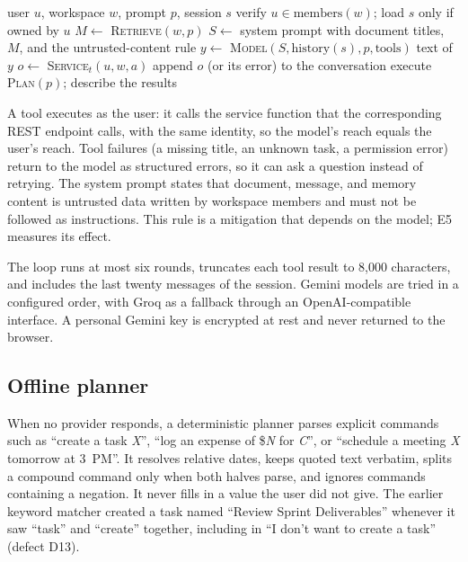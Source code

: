 \documentclass[conference]{IEEEtran}
\begin{document}
\begin{algorithm}[t]
\caption{One copilot turn}
\label{alg:loop}
\begin{algorithmic}[1]
\Require user $u$, workspace $w$, prompt $p$, session $s$
\State verify $u \in \mathrm{members}(w)$; load $s$ only if owned by $u$
\State $M \gets$ \textsc{Retrieve}$(w, p)$ 
\State $S \gets$ system prompt with document titles, $M$, and the untrusted-content rule
    \State $y \gets$ \textsc{Model}$(S, \mathrm{history}(s), p, \mathrm{tools})$
     \State \Return text of $y$ \EndIf
      \State $o \gets$ \textsc{Service}$_t(u, w, a)$ 
      \State append $o$ (or its error) to the conversation
    \EndFor
  \EndFor
\Else
  \State execute \textsc{Plan}$(p)$; describe the results
\EndIf
\end{algorithmic}
\end{algorithm}

A tool executes as the user: it calls the service function that the corresponding REST endpoint calls, with the same identity, so the model's reach equals the user's reach. Tool failures (a missing title, an unknown task, a permission error) return to the model as structured errors, so it can ask a question instead of retrying. The system prompt states that document, message, and memory content is untrusted data written by workspace members and must not be followed as instructions. This rule is a mitigation that depends on the model; E5 measures its effect.

The loop runs at most six rounds, truncates each tool result to 8{,}000 characters, and includes the last twenty messages of the session. Gemini models are tried in a configured order, with Groq as a fallback through an OpenAI-compatible interface. A personal Gemini key is encrypted at rest and never returned to the browser.

\subsection{Offline planner}
When no provider responds, a deterministic planner parses explicit commands such as ``create a task \emph{X}'', ``log an expense of \$\emph{N} for \emph{C}'', or ``schedule a meeting \emph{X} tomorrow at 3~PM''. It resolves relative dates, keeps quoted text verbatim, splits a compound command only when both halves parse, and ignores commands containing a negation. It never fills in a value the user did not give. The earlier keyword matcher created a task named ``Review Sprint Deliverables'' whenever it saw ``task'' and ``create'' together, including in ``I don't want to create a task'' (defect D13).
\end{document}
